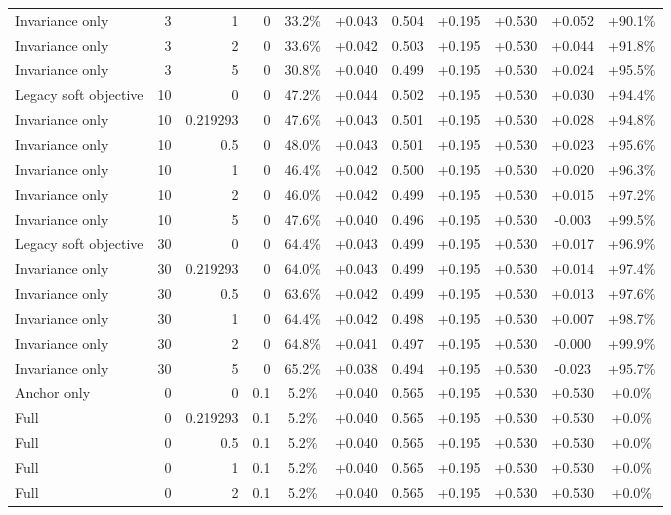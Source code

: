 \begin{table}[htbp]
\begin{tabular}{lrrrccccccc}
Invariance only & 3 & 1 & 0 & 33.2\% & +0.043 & 0.504 & +0.195 & +0.530 & +0.052 & +90.1\% \\
Invariance only & 3 & 2 & 0 & 33.6\% & +0.042 & 0.503 & +0.195 & +0.530 & +0.044 & +91.8\% \\
Invariance only & 3 & 5 & 0 & 30.8\% & +0.040 & 0.499 & +0.195 & +0.530 & +0.024 & +95.5\% \\
Legacy soft objective & 10 & 0 & 0 & 47.2\% & +0.044 & 0.502 & +0.195 & +0.530 & +0.030 & +94.4\% \\
Invariance only & 10 & 0.219293 & 0 & 47.6\% & +0.043 & 0.501 & +0.195 & +0.530 & +0.028 & +94.8\% \\
Invariance only & 10 & 0.5 & 0 & 48.0\% & +0.043 & 0.501 & +0.195 & +0.530 & +0.023 & +95.6\% \\
Invariance only & 10 & 1 & 0 & 46.4\% & +0.042 & 0.500 & +0.195 & +0.530 & +0.020 & +96.3\% \\
Invariance only & 10 & 2 & 0 & 46.0\% & +0.042 & 0.499 & +0.195 & +0.530 & +0.015 & +97.2\% \\
Invariance only & 10 & 5 & 0 & 47.6\% & +0.040 & 0.496 & +0.195 & +0.530 & -0.003 & +99.5\% \\
Legacy soft objective & 30 & 0 & 0 & 64.4\% & +0.043 & 0.499 & +0.195 & +0.530 & +0.017 & +96.9\% \\
Invariance only & 30 & 0.219293 & 0 & 64.0\% & +0.043 & 0.499 & +0.195 & +0.530 & +0.014 & +97.4\% \\
Invariance only & 30 & 0.5 & 0 & 63.6\% & +0.042 & 0.499 & +0.195 & +0.530 & +0.013 & +97.6\% \\
Invariance only & 30 & 1 & 0 & 64.4\% & +0.042 & 0.498 & +0.195 & +0.530 & +0.007 & +98.7\% \\
Invariance only & 30 & 2 & 0 & 64.8\% & +0.041 & 0.497 & +0.195 & +0.530 & -0.000 & +99.9\% \\
Invariance only & 30 & 5 & 0 & 65.2\% & +0.038 & 0.494 & +0.195 & +0.530 & -0.023 & +95.7\% \\
Anchor only & 0 & 0 & 0.1 & 5.2\% & +0.040 & 0.565 & +0.195 & +0.530 & +0.530 & +0.0\% \\
Full & 0 & 0.219293 & 0.1 & 5.2\% & +0.040 & 0.565 & +0.195 & +0.530 & +0.530 & +0.0\% \\
Full & 0 & 0.5 & 0.1 & 5.2\% & +0.040 & 0.565 & +0.195 & +0.530 & +0.530 & +0.0\% \\
Full & 0 & 1 & 0.1 & 5.2\% & +0.040 & 0.565 & +0.195 & +0.530 & +0.530 & +0.0\% \\
Full & 0 & 2 & 0.1 & 5.2\% & +0.040 & 0.565 & +0.195 & +0.530 & +0.530 & +0.0\% \\

\end{tabular}
\end{table}
